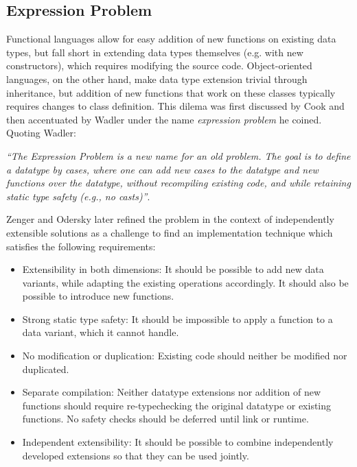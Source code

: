 \documentclass[preprint]{sigplanconf}
\begin{document}
\subsection{Expression Problem}
\label{sec:exp}

Functional languages allow for easy addition of new functions on existing data 
types, but fall short in extending data types themselves (e.g. with new constructors), 
which requires modifying the source code. Object-oriented languages, on the 
other hand, make data type extension trivial through inheritance, but addition 
of new functions that work on these classes typically requires changes to class 
definition. This dilema was first discussed by Cook\cite{Cook90} and then 
accentuated by Wadler\cite{exprproblem} under the name \emph{expression problem} 
he coined. Quoting Wadler:

\emph{``The Expression Problem is a new name for an old problem. The goal is
to define a datatype by cases, where one can add new cases to the
datatype and new functions over the datatype, without recompiling
existing code, and while retaining static type safety (e.g., no
casts)''}.

Zenger and Odersky later refined the problem in the context of independently 
extensible solutions\cite{fool12} as a challenge to find an implementation 
technique which satisfies the following requirements:

\begin{itemize}
\item Extensibility in both dimensions: It should be possible to add new data 
      variants, while adapting the existing operations accordingly. It should 
      also be possible to introduce new functions.
\item Strong static type safety: It should be impossible to apply a function to 
      a data variant, which it cannot handle.
\item No modification or duplication: Existing code should neither be modified 
      nor duplicated.
\item Separate compilation: Neither datatype extensions nor addition of new 
      functions should require re-typechecking the original datatype or 
      existing functions. No safety checks should be deferred until link or 
      runtime.
\item Independent extensibility: It should be possible to combine independently 
      developed extensions so that they can be used jointly.
\end{itemize}
\end{document}
